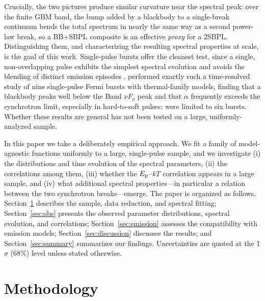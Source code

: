 \documentclass[twocolumn]{aastex631}
\newcommand{\Ep}{\ensuremath{E_{\rm p}}}
\newcommand{\kT}{\ensuremath{kT}}
\begin{document}
Crucially, the two pictures produce similar curvature near the spectral peak:
over the finite GBM band, the bump added by a blackbody to a single-break
continuum bends the total spectrum in nearly the same way as a second
power-law break, so a BB$+$SBPL composite is an effective \emph{proxy}
for a 2SBPL. Distinguishing them, and characterizing the resulting spectral
properties at scale, is the goal of this work. Single-pulse bursts offer the
cleanest test, since a single, non-overlapping pulse exhibits the simplest
spectral evolution and avoids the blending of distinct emission episodes
\citep[e.g.,][]{RydePeer2009,Basak2014,Burgess2014b,Busby2024}.
\citet{Basak2014} performed exactly such a time-resolved study of nine
single-pulse Fermi bursts with thermal-family models, finding that a blackbody
peaks well below the Band $\nu F_\nu$ peak and that $\alpha$ frequently exceeds
the synchrotron limit, especially in hard-to-soft pulses; \citet{Burgess2014a}
were limited to six bursts. Whether these results are general has not been tested
on a large, uniformly-analyzed sample.

In this paper we take a deliberately empirical approach. We fit a family of
model-agnostic functions uniformly to a large, single-pulse sample, and we
investigate (i) the distributions and time evolution of the spectral parameters,
(ii) the correlations among them, (iii) whether the \citet{Burgess2014a}
$\Ep$--$\kT$ correlation appears in a large sample, and (iv) what additional
spectral properties---in particular a relation between the two synchrotron
breaks---emerge. The paper is organized as follows. Section~\ref{sec:method}
describes the sample, data reduction, and spectral fitting; Section~\ref{sec:obs}
presents the observed parameter distributions, spectral evolution, and
correlations; Section~\ref{sec:emission} assesses the compatibility with emission
models; Section~\ref{sec:discussion} discusses the results; and
Section~\ref{sec:summary} summarizes our findings. Uncertainties are quoted at the
1$\sigma$ (68\%) level unless stated otherwise.

\section{Methodology} \label{sec:method}
\end{document}
